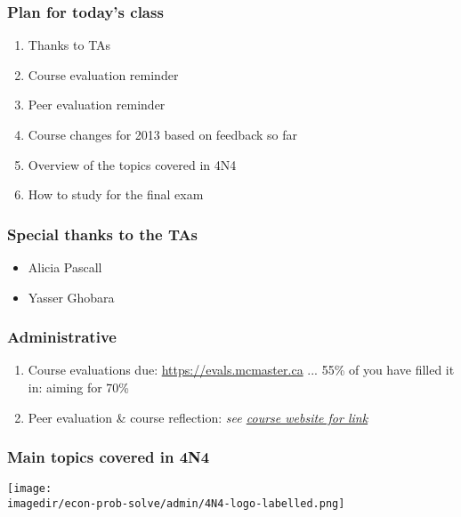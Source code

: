 
\begin{frame}\frametitle{Plan for today's class}
	\begin{enumerate}
		\item	Thanks to TAs
		\item	Course evaluation reminder
		\item	Peer evaluation reminder
		\item	Course changes for 2013 based on feedback so far
		\item	Overview of the topics covered in 4N4
		\item	How to study for the final exam
	\end{enumerate}
\end{frame}

\begin{frame}\frametitle{Special thanks to the TAs}
	\begin{itemize}
		\item	Alicia Pascall
		\item	Yasser Ghobara
	\end{itemize}
\end{frame}

\begin{frame}\frametitle{Administrative}
	\begin{enumerate}
		\item	Course evaluations due: \href{https://evals.mcmaster.ca}{https://evals.mcmaster.ca} ... 55\% of you have filled it in: aiming for 70\%
		\item	Peer evaluation \& course reflection: \emph{see \href{https://docs.google.com/spreadsheet/viewform?formkey=dFE0M1J3NWstZjE5SE4tN19lRGxheGc6MQ}{course website for link}}
	\end{enumerate}
\end{frame}

\begin{frame}\frametitle{Main topics covered in 4N4}
	\begin{center}
		\texttt{[image: \\imagedir/econ-prob-solve/admin/4N4-logo-labelled.png]}
	\end{center}
	\vspace{-12pt}
	{\small {\color{brown}{This is a unique course: not taught anywhere else.}}}
\end{frame}

